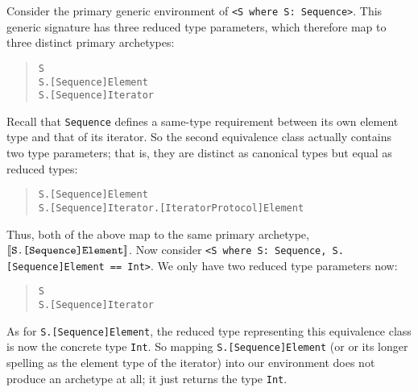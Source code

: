 \documentclass[../generics]{subfiles}
\begin{document}
\begin{example}
%
Consider the primary generic environment of \verb|<S where S: Sequence>|. This generic signature has three reduced type parameters, which therefore map to three distinct primary archetypes:
\begin{quote}
\begin{verbatim}
S
S.[Sequence]Element
S.[Sequence]Iterator
\end{verbatim}
\end{quote}
Recall that \texttt{Sequence} defines a same-type requirement between its own element type and that of its iterator. So the second equivalence class actually contains two type parameters; that is, they are distinct as canonical types but equal as reduced types:
\begin{quote}
\begin{verbatim}
S.[Sequence]Element
S.[Sequence]Iterator.[IteratorProtocol]Element
\end{verbatim}
\end{quote}
Thus, both of the above map to the same primary archetype, $[\![\texttt{S.[Sequence]Element}]\!]$.
Now consider \verb|<S where S: Sequence, S.[Sequence]Element == Int>|. We only have two reduced type parameters now:
\begin{quote}
\begin{verbatim}
S
S.[Sequence]Iterator
\end{verbatim}
\end{quote}
As for \texttt{S.[Sequence]Element}, the reduced type representing this equivalence class is now the concrete type \texttt{Int}. So mapping \texttt{S.[Sequence]Element} (or or its longer spelling as the element type of the iterator) into our environment does not produce an archetype at all;  it just returns the type \texttt{Int}.
\end{example}
\end{document}
